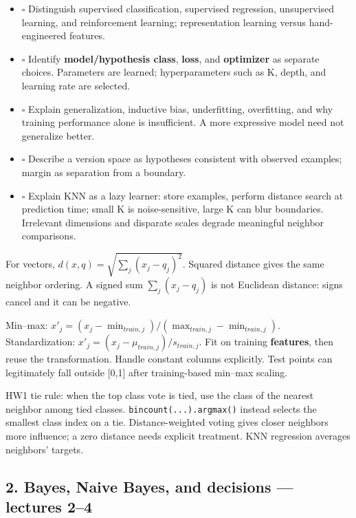 \documentclass[11pt]{article}
\begin{document}
\begin{itemize}
\item \(\square\) Distinguish supervised classification, supervised regression, unsupervised learning, and reinforcement learning; representation learning versus hand-engineered features.
\item \(\square\) Identify \textbf{model/\allowbreak{}hypothesis class}, \textbf{loss}, and \textbf{optimizer} as separate choices. Parameters are learned; hyperparameters such as K, depth, and learning rate are selected.
\item \(\square\) Explain generalization, inductive bias, underfitting, overfitting, and why training performance alone is insufficient. A more expressive model need not generalize better.
\item \(\square\) Describe a version space as hypotheses consistent with observed examples; margin as separation from a boundary.
\item \(\square\) Explain KNN as a lazy learner: store examples, perform distance search at prediction time; small K is noise-sensitive, large K can blur boundaries. Irrelevant dimensions and disparate scales degrade meaningful neighbor comparisons.
\end{itemize}

For vectors, $d(x,q)=\sqrt{\sum_j(x_j-q_j)^2}$. Squared distance gives the same neighbor ordering. A signed sum $\sum_j(x_j-q_j)$ is not Euclidean distance: signs cancel and it can be negative.

Min–max: $x'_j=(x_j-\min_{train,j})/(\max_{train,j}-\min_{train,j})$. Standardization: $x'_j=(x_j-\mu_{train,j})/s_{train,j}$. Fit on training \textbf{features}, then reuse the transformation. Handle constant columns explicitly. Test points can legitimately fall outside [0,1] after training-based min–max scaling.

HW1 tie rule: when the top class vote is tied, use the class of the nearest neighbor among tied classes. \texttt{bincount(...).argmax()} instead selects the smallest class index on a tie. Distance-weighted voting gives closer neighbors more influence; a zero distance needs explicit treatment. KNN regression averages neighbors' targets.

\subsection*{2. Bayes, Naive Bayes, and decisions — lectures 2–4}
\end{document}
